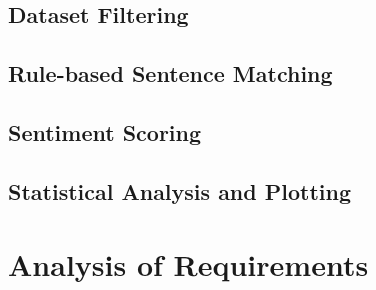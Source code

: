 \documentclass{report}
\begin{document}



\subsection{Dataset Filtering}

\subsection{Rule-based Sentence Matching}

\subsection{Sentiment Scoring}



\subsection{Statistical Analysis and Plotting}



\section{Analysis of Requirements}

\end{document}
